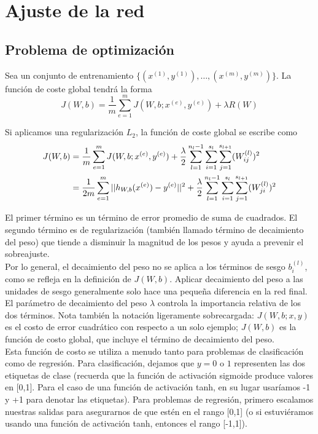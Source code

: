 \section{Ajuste de la red}

\subsection{Problema de optimización}

Sea un conjunto de entrenamiento $\{(x^{(1)}, y^{(1)}), \ldots, (x^{(m)}, y^{(m)})\}$. La función de coste global tendrá la forma 
\begin{equation}
J(W, b) = \frac{1}{m} \sum_{e = 1}^m J(W, b; x^{(e)}, y^{(e)}) + \lambda R(W)
\end{equation}

Si aplicamos una regularización $L_2$, la función de coste global se escribe como
\begin{align}
J(W, b) &= \frac{1}{m} \sum_{e = 1}^m J(W, b; x^{(e)}, y^{(e)}) + \frac{\lambda}{2} \sum_{l = 1}^{n_l - 1} \sum_{i = 1}^{s_l} \sum_{j = 1}^{s_{l+1}} (W_{ij}^{(l)})^2 \notag \\
&= \frac{1}{2m} \sum_{e = 1}^m ||h_{W, b}(x^{(e)}) - y^{(e)}||^2 + \frac{\lambda}{2} \sum_{l = 1}^{n_l - 1} \sum_{i = 1}^{s_l} \sum_{j = 1}^{s_{l+1}} (W_{ji}^{(l)})^2
\end{align} 

\noindent El primer término es un término de error promedio de suma de cuadrados. El segundo término es de regularización (también llamado término de decaimiento del peso) que tiende a disminuir la magnitud de los pesos y ayuda a prevenir el sobreajuste. \\

Por lo general, el decaimiento del peso no se aplica a los términos de sesgo $b^{(l)}_i$, como se refleja en la definición de $J(W,b)$. Aplicar decaimiento del peso a las unidades de sesgo generalmente solo hace una pequeña diferencia en la red final. \\

El parámetro de decaimiento del peso $\lambda$ controla la importancia relativa de los dos términos. Nota también la notación ligeramente sobrecargada: $J(W,b;x,y)$ es el costo de error cuadrático con respecto a un solo ejemplo; $J(W,b)$ es la función de costo global, que incluye el término de decaimiento del peso. \\

Esta función de costo se utiliza a menudo tanto para problemas de clasificación como de regresión. Para clasificación, dejamos que $y=0$ o $1$ representen las dos etiquetas de clase (recuerda que la función de activación sigmoide produce valores en [0,1]. Para el caso de una función de activación tanh, en su lugar usaríamos -1 y +1 para denotar las etiquetas). Para problemas de regresión, primero escalamos nuestras salidas para asegurarnos de que estén en el rango [0,1] (o si estuviéramos usando una función de activación tanh, entonces el rango [-1,1]). \\

